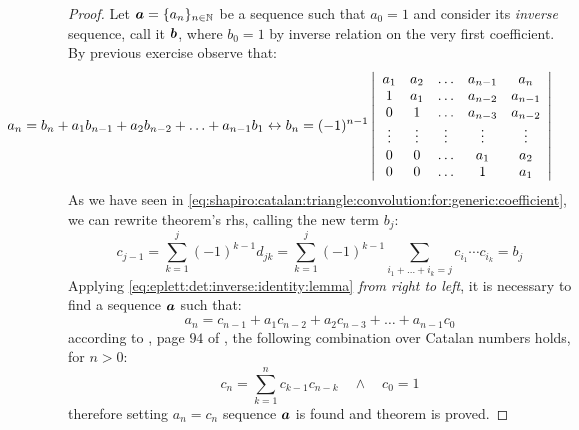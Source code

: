 \begin{proof}
    Let $\boldsymbol{a}=\lbrace a_{n}\rbrace_{n\in\mathbb{N}}$ be a sequence such
    that $a_{0}=1$ and consider its \emph{inverse} sequence, call it $\boldsymbol{b}$,
    where $b_{0}=1$ by inverse relation on the very first coefficient.
    By previous exercise observe that:
    \begin{equation}                
        \hspace{-2cm}
        a_{n} = b_{n}+a_{1}b_{n-1}+a_{2}b_{n-2}+\ldots+a_{n-1}b_{1}
        \leftrightarrow
        b_{n} = (-1)^{n-1}
            \left|
            \begin{array}{ccccc}
                a_1 & a_2 & \ldots & a_{n-1} & a_{n}\\
                1 & a_1 & \ldots & a_{n-2} & a_{n-1}\\
                0   & 1 & \ldots & a_{n-3} & a_{n-2}\\
                \vdots & \vdots & \vdots & \vdots & \vdots\\
                0 & 0 & \ldots & a_{1} & a_{2}\\
                0 & 0 & \ldots & 1 & a_{1}\\
            \end{array}
            \right|
        \label{eq:eplett:det:inverse:identity:lemma}
    \end{equation}                
    As we have seen in
    \autoref{eq:shapiro:catalan:triangle:convolution:for:generic:coefficient}, 
    we can rewrite theorem's \ac{rhs}, calling the new term $b_{j}$:
    \begin{displaymath}                
        c_{j-1}=\sum_{k=1}^{j}{(-1)^{k-1}d_{jk}}
            = \sum_{k=1}^{j}{(-1)^{k-1}\sum_{i_{1}+\ldots+i_{k}=j}{c_{i_{1}}\cdots c_{i_{k}}}}=b_{j}
    \end{displaymath}                
    Applying \autoref{eq:eplett:det:inverse:identity:lemma} \emph{from right to left}, 
    it is necessary to find a sequence $\boldsymbol{a}$ such that:
    \begin{displaymath}                
        a_{n} = c_{n-1}+a_{1}c_{n-2}+a_{2}c_{n-3}+\ldots+a_{n-1}c_{0}
    \end{displaymath}                
    according to \citeauthor{feller:intro:combinatorial:analysis}, page $94$ of
    \cite{feller:intro:combinatorial:analysis}, the following combination over
    Catalan numbers holds, for $n>0$:
    \begin{displaymath}                
        c_{n}=\sum_{k=1}^{n}{c_{k-1}c_{n-k}}\quad\wedge\quad c_{0}=1
    \end{displaymath}                
    therefore setting $a_{n}=c_{n}$ sequence $\boldsymbol{a}$ is found and theorem
    is proved.

\end{proof}
